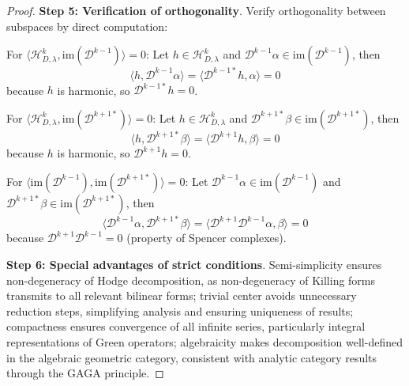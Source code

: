 \documentclass[10pt,a4paper]{amsart}
\begin{document}
\begin{proof}
\textbf{Step 5: Verification of orthogonality}. Verify orthogonality between subspaces by direct computation:

For $\langle \mathcal{H}^k_{D,\lambda}, \mathrm{im}(\mathcal{D}^{k-1}) \rangle = 0$: Let $h \in \mathcal{H}^k_{D,\lambda}$ and $\mathcal{D}^{k-1}\alpha \in \mathrm{im}(\mathcal{D}^{k-1})$, then
$$\langle h, \mathcal{D}^{k-1}\alpha \rangle = \langle \mathcal{D}^{k-1*}h, \alpha \rangle = 0$$
because $h$ is harmonic, so $\mathcal{D}^{k-1*}h = 0$.

For $\langle \mathcal{H}^k_{D,\lambda}, \mathrm{im}(\mathcal{D}^{k+1*}) \rangle = 0$: Let $h \in \mathcal{H}^k_{D,\lambda}$ and $\mathcal{D}^{k+1*}\beta \in \mathrm{im}(\mathcal{D}^{k+1*})$, then
$$\langle h, \mathcal{D}^{k+1*}\beta \rangle = \langle \mathcal{D}^{k+1}h, \beta \rangle = 0$$
because $h$ is harmonic, so $\mathcal{D}^{k+1}h = 0$.

For $\langle \mathrm{im}(\mathcal{D}^{k-1}), \mathrm{im}(\mathcal{D}^{k+1*}) \rangle = 0$: Let $\mathcal{D}^{k-1}\alpha \in \mathrm{im}(\mathcal{D}^{k-1})$ and $\mathcal{D}^{k+1*}\beta \in \mathrm{im}(\mathcal{D}^{k+1*})$, then
$$\langle \mathcal{D}^{k-1}\alpha, \mathcal{D}^{k+1*}\beta \rangle = \langle \mathcal{D}^{k+1}\mathcal{D}^{k-1}\alpha, \beta \rangle = 0$$
because $\mathcal{D}^{k+1}\mathcal{D}^{k-1} = 0$ (property of Spencer complexes).

\textbf{Step 6: Special advantages of strict conditions}. Semi-simplicity ensures non-degeneracy of Hodge decomposition, as non-degeneracy of Killing forms transmits to all relevant bilinear forms; trivial center avoids unnecessary reduction steps, simplifying analysis and ensuring uniqueness of results; compactness ensures convergence of all infinite series, particularly integral representations of Green operators; algebraicity makes decomposition well-defined in the algebraic geometric category, consistent with analytic category results through the GAGA principle.
\end{proof}
\end{document}
